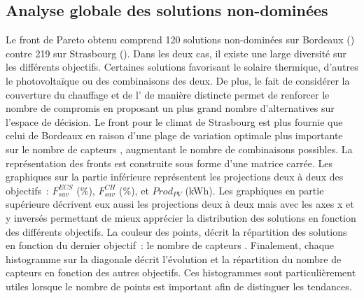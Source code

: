 \subsection{Analyse globale des solutions non-dominées} %
\label{sub:analyse_globale_des_solutions_non_dominees}
Le front de Pareto obtenu comprend \num{120} solutions non-dominées sur Bordeaux
() contre \num{219} sur Strasbourg
(). Dans les deux cas, il existe une large diversité
sur les différents objectifs. Certaines solutions favorisant le solaire thermique,
d’autres le photovoltaïque ou des combinaisons des deux. De plus, le fait de considérer
la couverture du chauffage et de l’ de manière distincte permet de renforcer le
nombre de compromis en proposant un plus grand nombre d’alternatives sur l’espace de décision.
Le front pour le climat de Strasbourg est plus fournie que celui de Bordeaux en raison d’une plage de variation
optimale plus importante sur le nombre de capteurs , augmentant le nombre de
combinaisons possibles.
La représentation des fronts est construite sous forme d’une matrice carrée.
Les graphiques sur la partie inférieure représentent les projections deux à deux des objectifs~:
$F_{sav}^{ECS}$ (\si{\percent}), $F_{sav}^{CH}$ (\si{\percent}), et $Prod_{PV}$ (\si{kWh}).
Les graphiques en partie supérieure décrivent eux aussi les projections deux à deux mais
avec les axes x et y inversés permettant de mieux
apprécier la distribution des solutions en fonction des différents objectifs. La couleur des points,
décrit la répartition des solutions en fonction du dernier objectif~: le nombre de capteurs .
Finalement, chaque histogramme sur la diagonale décrit l’évolution et la répartition du
nombre de capteurs  en fonction des autres objectifs. Ces histogrammes sont
particulièrement utiles lorsque le nombre de points est important afin de distinguer
les tendances.

